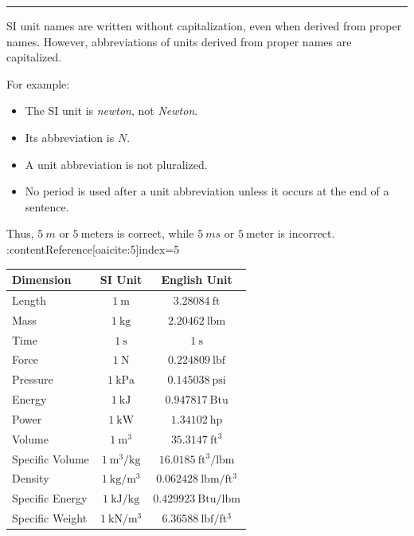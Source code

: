 \documentclass[12pt]{article}
\newcommand{\mysubsection}[2]{%
    \noindent{\headingfont\large #1\space #2\par}
    \vspace{4pt}
    \hrule
    \vspace{15pt}
}
\begin{document}
\mysubsection{}{Unit Conventions}

SI unit names are written without capitalization, even when derived from proper names. However, abbreviations of units derived from proper names are capitalized.

For example:
\begin{itemize}
    \item The SI unit is \textit{newton}, not \textit{Newton}.
    \item Its abbreviation is \(N\).
    \item A unit abbreviation is not pluralized.
    \item No period is used after a unit abbreviation unless it occurs at the end of a sentence.
\end{itemize}

Thus, \(5~m\) or \(5~\text{meters}\) is correct, while \(5~ms\) or \(5~\text{meter}\) is incorrect. :contentReference[oaicite:5]{index=5}
\begin{center}
    \begin{tabular}{|l|c|c|}
        \hline
        \textbf{Dimension} & \textbf{SI Unit} & \textbf{English Unit} \\
        \hline
        Length & \(1~\mathrm{m}\) & \(3.28084~\mathrm{ft}\) \\
        \hline
        Mass & \(1~\mathrm{kg}\) & \(2.20462~\mathrm{lbm}\) \\
        \hline
        Time & \(1~\mathrm{s}\) & \(1~\mathrm{s}\) \\
        \hline
        Force & \(1~\mathrm{N}\) & \(0.224809~\mathrm{lbf}\) \\
        \hline
        Pressure & \(1~\mathrm{kPa}\) & \(0.145038~\mathrm{psi}\) \\
        \hline
        Energy & \(1~\mathrm{kJ}\) & \(0.947817~\mathrm{Btu}\) \\
        \hline
        Power & \(1~\mathrm{kW}\) & \(1.34102~\mathrm{hp}\) \\
        \hline
        Volume & \(1~\mathrm{m^3}\) & \(35.3147~\mathrm{ft^3}\) \\
        \hline
        Specific Volume & \(1~\mathrm{m^3/kg}\) & \(16.0185~\mathrm{ft^3/lbm}\) \\
        \hline
        Density & \(1~\mathrm{kg/m^3}\) & \(0.062428~\mathrm{lbm/ft^3}\) \\
        \hline
        Specific Energy & \(1~\mathrm{kJ/kg}\) & \(0.429923~\mathrm{Btu/lbm}\) \\
        \hline
        Specific Weight & \(1~\mathrm{kN/m^3}\) & \(6.36588~\mathrm{lbf/ft^3}\) \\
        \hline
    \end{tabular}
\end{center}
\end{document}
